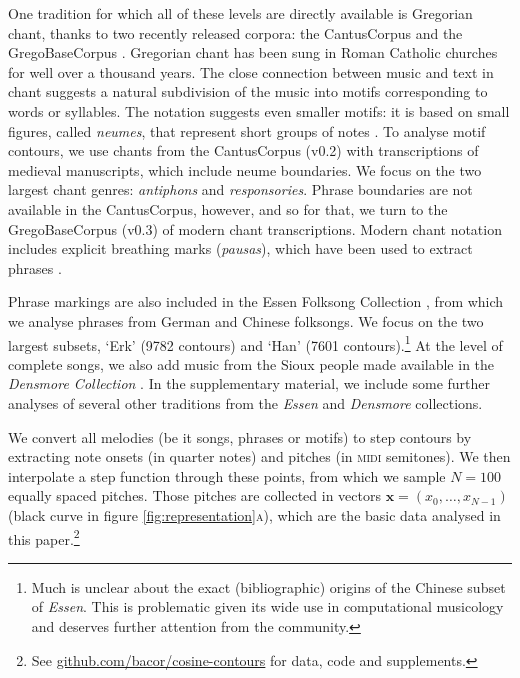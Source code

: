 \documentclass{article}
\newcommand{\vect}[1]{\mathrm{\mathbf{#1}}}
\begin{document}
One tradition for which all of these levels are directly available is Gregorian chant, thanks to two recently released corpora: the CantusCorpus and the GregoBaseCorpus \cite{Cornelissen2020DLfM}.
Gregorian chant has been sung in Roman Catholic churches for well over a thousand years.
The close connection between music and text in chant suggests a natural subdivision of the music into motifs corresponding to words or syllables. 
The notation suggests even smaller motifs: it is based on small figures, called \emph{neumes}, that represent short groups of notes \cite{Kelly2018}.
To analyse motif contours, we use chants from the CantusCorpus (v0.2) with transcriptions of medieval manuscripts, which include neume boundaries. 
We focus on the two largest chant genres: \emph{antiphons} and \emph{responsories}.
Phrase boundaries are not available in the CantusCorpus, however, and so for that, we turn to the GregoBaseCorpus (v0.3) of modern chant transcriptions.
Modern chant notation includes explicit breathing marks (\emph{pausas}), which have been used to extract phrases \cite{Cornelissen2020DLfM}.


Phrase markings are also included in the Essen Folksong Collection \cite{Schaffrath1995}, from which we analyse phrases from German and Chinese folksongs.
We focus on the two largest subsets, `Erk' \cite{Erk1893} (9782 contours) and `Han' (7601 contours).\footnote{%
    Much is unclear about the exact (bibliographic) origins of the Chinese subset of \emph{Essen}.
    This is problematic given its wide use in computational musicology and deserves further attention from the community.
    }%
At the level of complete songs, we also add music from the Sioux people made available in the \emph{Densmore Collection} \cite{Densmore1918,Shanahan2014}.
In the supplementary material, we include some further analyses of several other traditions from the \emph{Essen} and \emph{Densmore} collections.


We convert all melodies (be it songs, phrases or motifs) to step contours by extracting note onsets (in quarter notes) and pitches (in \textsc{midi} semitones).
We then interpolate a step function through these points, from which we sample $N=100$ equally spaced pitches.
Those pitches are collected in vectors $\vect x = (x_0, \dots, x_{N-1})$ (black curve in figure \ref{fig:representation}\textsc{a}), which are the basic data analysed in this paper.\footnote{%
    See \href{https://github.com/bacor/cosine-contours}{github.com/bacor/cosine-contours}
    for data, code and supplements.
    }%
\end{document}
